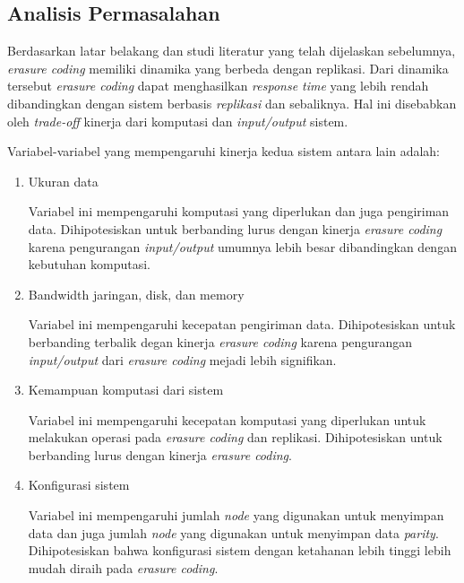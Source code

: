 \subsection{Analisis Permasalahan}
\label{subsection:analisis-permasalahan}


Berdasarkan latar belakang dan studi literatur yang telah dijelaskan sebelumnya, \textit{erasure coding} memiliki dinamika yang berbeda dengan replikasi. Dari dinamika tersebut \textit{erasure coding} dapat menghasilkan \textit{response time} yang lebih rendah dibandingkan dengan sistem berbasis \textit{replikasi} dan sebaliknya. Hal ini disebabkan oleh \textit{trade-off} kinerja dari komputasi dan \textit{input/output} sistem.

Variabel-variabel yang mempengaruhi kinerja kedua sistem antara lain adalah:
\begin{enumerate}
    \item Ukuran data
    
    Variabel ini mempengaruhi komputasi yang diperlukan dan juga pengiriman data. Dihipotesiskan untuk berbanding lurus dengan kinerja \textit{erasure coding} karena pengurangan \textit{input/output} umumnya lebih besar dibandingkan dengan kebutuhan komputasi.

    \item Bandwidth jaringan, disk, dan memory
    
    Variabel ini mempengaruhi kecepatan pengiriman data. Dihipotesiskan untuk berbanding terbalik degan kinerja \textit{erasure coding} karena pengurangan \textit{input/output} dari \textit{erasure coding} mejadi lebih signifikan.

    \item Kemampuan komputasi dari sistem
    
    Variabel ini mempengaruhi kecepatan komputasi yang diperlukan untuk melakukan operasi pada \textit{erasure coding} dan replikasi. Dihipotesiskan untuk berbanding lurus dengan kinerja \textit{erasure coding}.
    
    \item Konfigurasi sistem
    
    Variabel ini mempengaruhi jumlah \textit{node} yang digunakan untuk menyimpan data dan juga jumlah \textit{node} yang digunakan untuk menyimpan data \textit{parity}. Dihipotesiskan bahwa konfigurasi sistem dengan ketahanan lebih tinggi lebih mudah diraih pada \textit{erasure coding}.

\end{enumerate}

